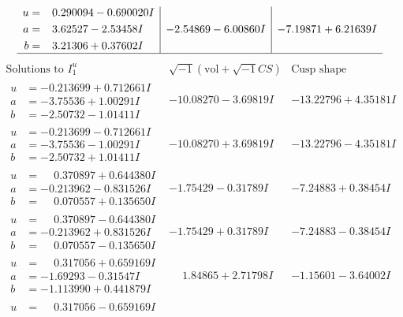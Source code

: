 \documentclass[1p]{elsarticle_modified}
\theoremstyle{definition}
\newcommand{\I}{\sqrt{-1}}
\begin{document}
$$\begin{array}{c|c|c}
\begin{aligned}
u &= \phantom{-}0.290094 - 0.690020 I \\
a &= \phantom{-}3.62527 - 2.53458 I \\
b &= \phantom{-}3.21306 + 0.37602 I\end{aligned}
 & -2.54869 - 6.00860 I & -7.19871 + 6.21639 I\\
 \hline 
 \end{array}$$\newpage$$\begin{array}{c|c|c}  
\text{Solutions to }I^u_{1}& \I (\text{vol} + \sqrt{-1}CS) & \text{Cusp shape}\\
 \hline 
\begin{aligned}
u &= -0.213699 + 0.712661 I \\
a &= -3.75536 + 1.00291 I \\
b &= -2.50732 - 1.01411 I\end{aligned}
 & -10.08270 - 3.69819 I & -13.22796 + 4.35181 I \\ \hline\begin{aligned}
u &= -0.213699 - 0.712661 I \\
a &= -3.75536 - 1.00291 I \\
b &= -2.50732 + 1.01411 I\end{aligned}
 & -10.08270 + 3.69819 I & -13.22796 - 4.35181 I \\ \hline\begin{aligned}
u &= \phantom{-}0.370897 + 0.644380 I \\
a &= -0.213962 - 0.831526 I \\
b &= \phantom{-}0.070557 + 0.135650 I\end{aligned}
 & -1.75429 - 0.31789 I & -7.24883 + 0.38454 I \\ \hline\begin{aligned}
u &= \phantom{-}0.370897 - 0.644380 I \\
a &= -0.213962 + 0.831526 I \\
b &= \phantom{-}0.070557 - 0.135650 I\end{aligned}
 & -1.75429 + 0.31789 I & -7.24883 - 0.38454 I \\ \hline\begin{aligned}
u &= \phantom{-}0.317056 + 0.659169 I \\
a &= -1.69293 - 0.31547 I \\
b &= -1.113990 + 0.441879 I\end{aligned}
 & \phantom{-}1.84865 + 2.71798 I & -1.15601 - 3.64002 I \\ \hline\begin{aligned}
u &= \phantom{-}0.317056 - 0.659169 I \\

\end{aligned}
\end{array}$$
\end{document}
